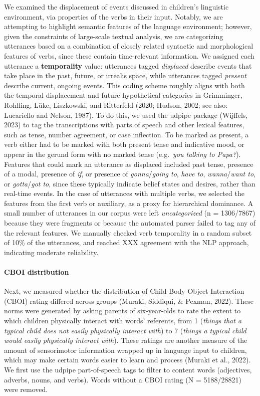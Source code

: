 \documentclass[
  man,floatsintext]{apa6}
\let\oldparagraph\paragraph
\renewcommand{\paragraph}[1]{\oldparagraph{#1}\mbox{}}
\begin{document}
We examined the displacement of events discussed in children's linguistic environment, via properties of the verbs in their input. Notably, we are attempting to highlight semantic features of the language environment; however, given the constraints of large-scale textual analysis, we are categorizing utterances based on a combination of closely related syntactic and morphological features of verbs, since these contain time-relevant information. We assigned each utterance a \textbf{temporality} value: utterances tagged \emph{displaced} describe events that take place in the past, future, or irrealis space, while utterances tagged \emph{present} describe current, ongoing events. This coding scheme roughly aligns with both the temporal displacement and future hypothetical categories in Grimminger, Rohlfing, Lüke, Liszkowski, and Ritterfeld (2020; Hudson, 2002; see also: Lucariello and Nelson, 1987). To do this, we used the udpipe package (Wijffels, 2023) to tag the transcriptions with parts of speech and other lexical features, such as tense, number agreement, or case inflection. To be marked as present, a verb either had to be marked with both present tense and indicative mood, or appear in the gerund form with no marked tense (e.g.~\emph{you talking to Papa?}). Features that could mark an utterance as displaced included past tense, presence of a modal, presence of \emph{if}, or presence of \emph{gonna}/\emph{going to}, \emph{have to}, \emph{wanna}/\emph{want to}, or \emph{gotta}/\emph{got to}, since these typically indicate belief states and desires, rather than real-time events. In the case of utterances with multiple verbs, we selected the features from the first verb or auxiliary, as a proxy for hierarchical dominance. A small number of utterances in our corpus were left \emph{uncategorized} (n = 1306/7867) because they were fragments or because the automated parser failed to tag any of the relevant features. We manually checked verb temporality in a random subset of 10\% of the utterances, and reached XXX agreement with the NLP approach, indicating moderate reliability.

\hypertarget{cboi-distribution}{%
\paragraph{CBOI distribution}\label{cboi-distribution}}

Next, we measured whether the distribution of Child-Body-Object Interaction (CBOI) rating differed across groups (Muraki, Siddiqui, \& Pexman, 2022). These norms were generated by asking parents of six-year-olds to rate the extent to which children physically interact with words' referents, from 1 (\emph{things that a typical child does not easily physically interact with}) to 7 (\emph{things a typical child would easily physically interact with}). These ratings are another measure of the amount of sensorimotor information wrapped up in language input to children, which may make certain words easier to learn and process (Muraki et al., 2022). We first use the udpipe part-of-speech tags to filter to content words (adjectives, adverbs, nouns, and verbs). Words without a CBOI rating (N = 5188/28821) were removed.
\end{document}
